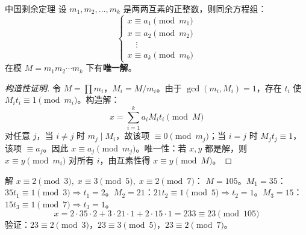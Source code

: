 \begin{myTheorem}{中国剩余定理}
设 \(m_1,m_2,\dots,m_k\) 是两两互素的正整数，则同余方程组：
\[
\begin{cases}
x \equiv a_1 \pmod{m_1} \\
x \equiv a_2 \pmod{m_2} \\
\quad \vdots \\
x \equiv a_k \pmod{m_k}
\end{cases}
\]
在模 \(M=m_1m_2\cdots m_k\) 下有\textbf{唯一解}。
\end{myTheorem}

\begin{proof}[构造性证明]
令 \(M=\prod m_i\)，\(M_i=M/m_i\)。由于 \(\gcd(m_i,M_i)=1\)，存在 \(t_i\) 使 \(M_i t_i\equiv1\pmod{m_i}\)。构造解：
\[
x = \sum_{i=1}^{k} a_i M_i t_i \pmod{M}
\]
对任意 \(j\)，当 \(i\neq j\) 时 \(m_j\mid M_i\)，故该项 \(\equiv0\pmod{m_j}\)；当 \(i=j\) 时 \(M_jt_j\equiv1\)，该项 \(\equiv a_j\)。因此 \(x\equiv a_j\pmod{m_j}\)。唯一性：若 \(x,y\) 都是解，则 \(x\equiv y\pmod{m_i}\) 对所有 \(i\)，由互素性得 \(x\equiv y\pmod{M}\)。
\end{proof}

\begin{example}
解 \(x\equiv2\pmod3,\;x\equiv3\pmod5,\;x\equiv2\pmod7\)：
\(M=105\)。\(M_1=35\)：\(35t_1\equiv1\pmod3\Rightarrow t_1=2\)。\(M_2=21\)：\(21t_2\equiv1\pmod5\Rightarrow t_2=1\)。\(M_3=15\)：\(15t_3\equiv1\pmod7\Rightarrow t_3=1\)。
\[
x = 2\cdot35\cdot2 + 3\cdot21\cdot1 + 2\cdot15\cdot1 = 233 \equiv 23 \pmod{105}
\]
验证：\(23\equiv2\pmod3\)，\(23\equiv3\pmod5\)，\(23\equiv2\pmod7\)。
\end{example}

\begin{center}
\end{center}

